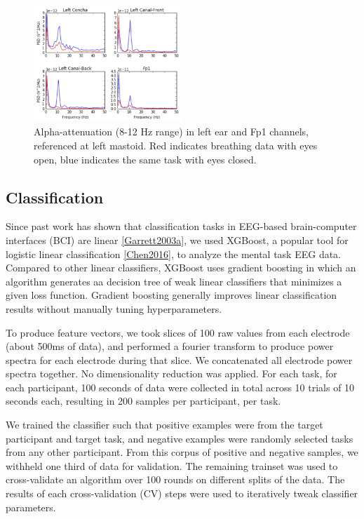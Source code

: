 \documentclass{sigchi}
\begin{document}
\begin{figure}[h]
\centering
\includegraphics[width=0.5\textwidth]{figures/002_AlphaAtt_all.jpg}
\caption{Alpha-attenuation (8-12 Hz range) in left ear and Fp1 channels, referenced at left mastoid. Red indicates breathing data with eyes open, blue indicates the same task with eyes closed.}
\label{fig:alpha_atten}
\end{figure}

\subsection{Classification}

Since past work has shown that classification tasks in EEG-based brain-computer interfaces (BCI) are linear \ref{Garrett2003a}, we used XGBoost, a popular tool for logistic linear classification \ref{Chen2016}, to analyze the mental task EEG data. Compared to other linear classifiers, XGBoost uses gradient boosting in which an algorithm generates aa decision tree of weak linear classifiers that minimizes a given loss function. Gradient boosting generally improves linear classification results without manually tuning hyperparameters.

To produce feature vectors, we took slices of 100 raw values from each electrode (about 500ms of data), and performed a fourier transform to produce power spectra for each electrode during that slice. We concatenated all electrode power spectra together. No dimensionality reduction was applied. For each task, for each participant, 100 seconds of data were collected in total across 10 trials of 10 seconds each, resulting in 200 samples per participant, per task.

We trained the classifier such that positive examples were from the target participant and target task, and negative examples were randomly selected tasks from any other participant. From this corpus of positive and negative samples, we withheld one third of data for validation. The remaining trainset was used to cross-validate an algorithm over 100 rounds on different splits of the data. The results of each cross-validation (CV) steps were used to iteratively tweak classifier parameters. 
\end{document}
